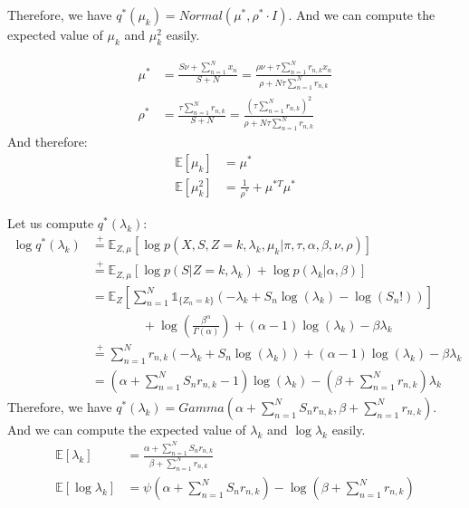 \documentclass{article}
\begin{document}
Therefore, we have $q^*(\mu_k) = Normal\left(\mu^*, \rho^* \cdot I\right)$. And we can compute the expected value of $\mu_k$ and $\mu_k^2$ easily.

\begin{equation}
  \begin{split}
    \mu^*  & = \frac{S\nu + \sum_{n=1}^{N}x_n}{S+N}   = \frac{\rho\nu + \tau\sum_{n=1}^{N}r_{n,k}x_n}{\rho + N\tau\sum_{n=1}^{N}r_{n,k}} \\
    \rho^* & = \frac{\tau\sum_{n=1}^{N}r_{n,k}}{S+N} = \frac{(\tau\sum_{n=1}^{N}r_{n,k})^2}{\rho + N\tau\sum_{n=1}^{N}r_{n,k}}
  \end{split}
\end{equation}
And therefore:
\begin{equation}
  \begin{split}
    \mathbb{E}[\mu_k]   & = \mu^*                            \\
    \mathbb{E}[\mu_k^2] & = \frac{1}{\rho^*} + \mu^{*T}\mu^*
  \end{split}
\end{equation}

\noindent Let us compute $q^*(\lambda_k)$:
\begin{equation}
  \begin{split}
    \log q^*(\lambda_k) & \overset{+}{=} \mathbb{E}_{Z,\mu}[\log p(X,S,Z = k,\lambda_k,\mu_k|\pi,\tau,\alpha,\beta,\nu,\rho)]                             \\
                        & \overset{+}{=} \mathbb{E}_{Z,\mu}[\log p(S|Z = k,\lambda_k) + \log p(\lambda_k|\alpha,\beta)]                                   \\
                        & = \mathbb{E}_{Z}\left[\sum_{n=1}^{N}\mathbb{1}_{\{Z_n = k\}}\left(-\lambda_k + S_n\log(\lambda_k) - \log(S_n!)\right)\right]    \\
                        & \qquad\qquad + \log \left(\frac{\beta^\alpha}{\Gamma(\alpha)}\right) + (\alpha - 1)\log(\lambda_k) - \beta\lambda_k             \\
                        & \overset{+}{=} \sum_{n=1}^{N}r_{n,k}\left(-\lambda_k + S_n\log(\lambda_k)\right) + (\alpha - 1)\log(\lambda_k) - \beta\lambda_k \\
                        & = \left(\alpha + \sum_{n=1}^{N}S_n r_{n,k} - 1\right)\log(\lambda_k) - \left(\beta + \sum_{n=1}^{N}r_{n,k}\right)\lambda_k
  \end{split}
\end{equation}
Therefore, we have $q^*(\lambda_k) = Gamma\left(\alpha + \sum_{n=1}^{N}S_n r_{n,k}, \beta + \sum_{n=1}^{N}r_{n,k}\right)$. And we can compute the expected value of $\lambda_k$ and $\log \lambda_k$ easily.
\begin{equation}
  \begin{split}
    \mathbb{E}[\lambda_k]      & = \frac{\alpha + \sum_{n=1}^{N}S_n r_{n,k}}{\beta + \sum_{n=1}^{N}r_{n,k}}       \\
    \mathbb{E}[\log \lambda_k] & = \psi(\alpha + \sum_{n=1}^{N}S_n r_{n,k}) - \log(\beta + \sum_{n=1}^{N}r_{n,k})
  \end{split}
\end{equation}
\end{document}
